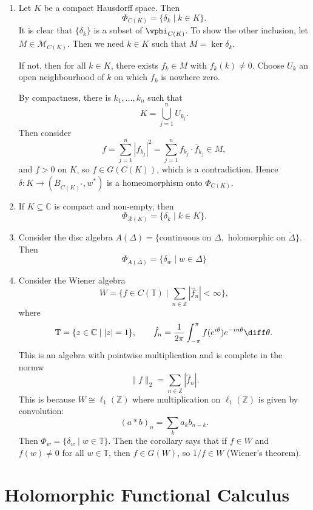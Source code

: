 \documentclass[12pt]{article}
\begin{document}
\begin{exbox}
	\begin{enumerate}
		\item Let $K$ be a compact Hausdorff space. Then
			\[
				\Phi_{C(K)} = \{\delta_k \mid k \in K\}.
			\]
			It is clear that $\{\delta_k\}$ is a subset of $\vphi_{C(K)}$. To show the other inclusion, let $M \in \mathcal{M}_{C(K)}$. Then we need $k \in K$ such that $M = \ker \delta_k$.

			If not, then for all $k \in K$, there exists $f_k \in M$ with $f_k(k) \neq 0$. Choose $U_k$ an open neighbourhood of $k$ on which $f_k$ is nowhere zero.

			By compactness, there is $k_1, \ldots, k_n$ such that
			\[
			K = \bigcup_{j = 1}^n U_{k_j}.
			\]
			Then consider
			\[
			f = \sum_{j = 1}^n |f_{k_j}|^2 = \sum_{j = 1}^n f_{k_j} \cdot \bar f_{k_j} \in M,
			\]
			and $f > 0$ on $K$, so $f \in G(C(K))$, which is a contradiction. Hence $\delta : K \to (B_{C(K)^{\ast}}, w^{\ast})$ is a homeomorphism onto $\Phi_{C(K)}$.
		\item If $K \subseteq \mathbb{C}$ is compact and non-empty, then
			\[
			\Phi_{\mathcal{R}(K)} = \{\delta_k \mid k \in K\}.
			\]
		\item Consider the disc algebra $A(\Delta) = \{\text{continuous on } \Delta, \text{ holomorphic on } \mathring \Delta\}$. Then
			\[
				\Phi_{A(\Delta)} = \{\delta_w \mid w \in \Delta\}
			\]
		\item Consider the Wiener algebra
			\[
				W = \{f \in C(\mathbb T) \mid \sum_{n \in \mathbb{Z}} |\hat f_n| < \infty\},
			\]
			where
			\[
				\mathbb T = \{z \in \mathbb{C} \mid |z| = 1\}, \qquad \hat f_n = \frac 1{2\pi} \int_{-\pi}^\pi f(e^{i\theta}) e^{-in\theta} \diff \theta.
			\]
			This is an algebra with pointwise multiplication and is complete in the normw
			\[
			\|f\|_2 = \sum_{n \in \mathbb{Z}} |\hat f_n|.
			\]
			This is because $W \cong \ell_1(\mathbb{Z})$ where multiplication on $\ell_1(\mathbb{Z})$ is given by convolution:
			\[
				(a \ast b)_n = \sum_k a_k b_{n-k}.
			\]
			Then $\Phi_w = \{\delta_w \mid w \in \mathbb T\}$. Then the corollary says that if $f \in W$ and $f(w) \neq 0$ for all $w \in \mathbb T$, then $f \in G(W)$, so $1/f \in W$ (Wiener's theorem).
	\end{enumerate}
\end{exbox}

\newpage

\section{Holomorphic Functional Calculus}%
\label{sec:hfc}
\end{document}
